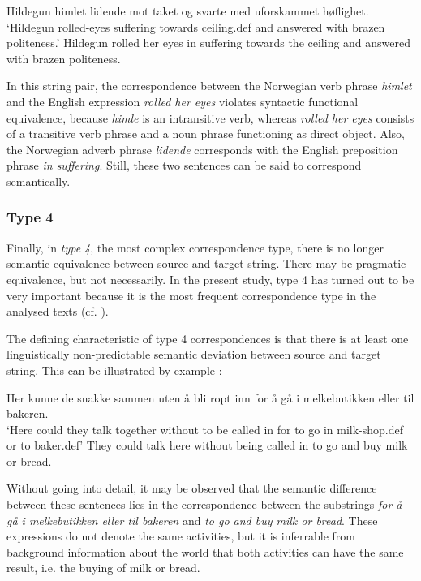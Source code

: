 \documentclass[output=paper]{LSP/langsci}
\begin{document}
\ea \label{ex:thunes:4}
\ea
Hildegun himlet lidende mot taket og svarte med uforskammet høflighet.\\
`Hildegun rolled{}-eyes suffering towards ceiling.def and answered with brazen  politeness.'
\ex
Hildegun rolled her eyes in suffering towards the ceiling and answered with  brazen politeness.
\z
\z

In this string pair, the correspondence between the Norwegian verb phrase \textit{himlet} and the English expression \textit{rolled her eyes} violates syntactic functional equivalence, because \textit{himle} is an intransitive verb, whereas \textit{rolled her eyes} consists of a transitive verb phrase and a noun phrase functioning as direct object. Also, the Norwegian adverb phrase \textit{lidende} corresponds with the English preposition phrase \textit{in suffering}. Still, these two sentences can be said to correspond semantically.

\subsubsection{Type 4}\label{sec:thunes:3.1.4}

Finally, in \textit{type 4}, the most complex correspondence type, there is no longer semantic equivalence between source and target string. There may be pragmatic equivalence, but not necessarily. In the present study, type 4 has turned out to be very important because it is the most frequent correspondence type in the analysed texts (cf. ).

The defining characteristic of type 4 correspondences is that there is at least one linguistically non-predictable semantic deviation between source and target string. This can be illustrated by example :

\ea \label{ex:thunes:5}
\ea
Her kunne de snakke sammen uten å bli ropt inn for å gå i melkebutikken eller   til bakeren. \\
`Here could they talk together without to be called in for to go in milk{}-shop.def  or to baker.def'
\ex 
They could talk here without being called in to go and buy milk or bread.
\z
\z
 
Without going into detail, it may be observed that the semantic difference between these sentences lies in the correspondence between the substrings \textit{for å gå i melkebutikken eller til bakeren} and \textit{to go and buy milk or bread}. These expressions do not denote the same activities, but it is inferrable from background information about the world that both activities can have the same result, i.e. the buying of milk or bread.
 
\end{document}
